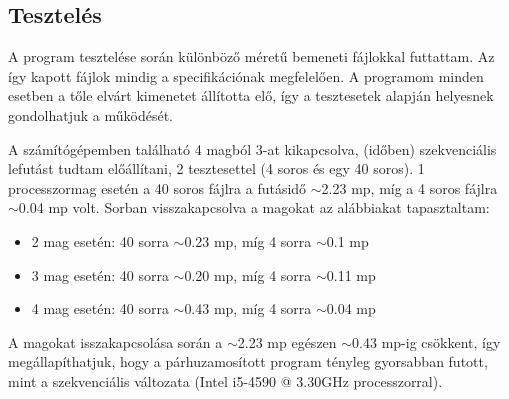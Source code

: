 \documentclass[12pt]{article}
\begin{document}
\subsection{Tesztelés}

A program tesztelése során különböző méretű bemeneti fájlokkal futtattam. Az így kapott fájlok mindig a specifikációnak megfelelően.
A programom minden esetben a tőle elvárt kimenetet állította elő, így a tesztesetek alapján helyesnek gondolhatjuk a működését.

A számítógépemben található 4 magból 3-at kikapcsolva, (időben) szekvenciális lefutást tudtam előállítani, 2 tesztesettel (4 soros és egy 40 soros). 1 processzormag esetén a 40 soros fájlra a futásidő $\sim$2.23 mp, míg a 4 soros fájlra $\sim$0.04 mp volt.
Sorban visszakapcsolva a magokat az alábbiakat tapasztaltam:
\begin{itemize}
    \item 2 mag esetén: 40 sorra $\sim$0.23 mp, míg 4 sorra $\sim$0.1 mp
    \item 3 mag esetén: 40 sorra $\sim$0.20 mp, míg 4 sorra $\sim$0.11 mp
    \item 4 mag esetén: 40 sorra $\sim$0.43 mp, míg 4 sorra $\sim$0.04 mp
\end{itemize}

A magokat isszakapcsolása során a $\sim$2.23 mp egészen $\sim$0.43 mp-ig csökkent, így megállapíthatjuk, hogy a párhuzamosított program tényleg gyorsabban futott, mint a szekvenciális változata (Intel i5-4590 @ 3.30GHz processzorral).\\
\\
\end{document}
